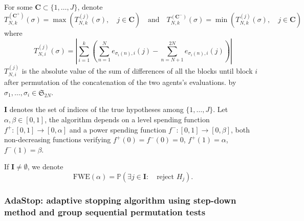 \documentclass{article}
\theoremstyle{plain}
\theoremstyle{remark}
\renewcommand{\P}{\mathbb{P}}
\renewcommand{\S}{\mathfrak{S}}
\newcommand{\1}{\mathbbm{1}}
\numberwithin{equation}{section}
\begin{document}
For some $\textbf{C} \subset \{1,\dots,J\}$, denote
$$T_{N,k}^{(\textbf{C}^+)}(\sigma)= \max\left(T_{N,k}^{(j)}(\sigma),\quad j \in \textbf{C}\right) \quad \text{and}\quad T_{N,k}^{(\textbf{C}^-)}(\sigma)= \min\left(T_{N,k}^{(j)}(\sigma),\quad j \in \textbf{C}\right)$$
where 
$$T_{N,i}^{(j)}(\sigma)= \left|\sum_{i=1}^k\left(\sum_{n=1}^{N} e_{\sigma_i(n),i}(j)-\sum_{n=N+1}^{2N} e_{\sigma_i(n),i}(j)\right)\right|$$ 
$T_{N,i}^{(j)}$ is the absolute value of the sum of differences of all the blocks until block $i$ after permutation of the concatenation of the two agents's evaluations. by $\sigma_1,\dots,\sigma_i\in \S_{2N}$.
 
$\textbf{I}$ denotes the set of indices of the true hypotheses among $\{1,\dots,J\}$. Let $\alpha, \beta \in [0,1]$, the algorithm depends on a level spending function $f^+:[0,1]\to[0,\alpha]$ and a power spending function $f^-:[0,1]\to [0,\beta]$, both non-decreasing functions verifying $f^+(0)=f^-(0)=0$, $f^+(1)=\alpha$, $f^-(1)=\beta$. 

If $\textbf{I} \neq \emptyset$, we denote 
$$\mathrm{FWE}(\alpha) = \P\left(\exists j \in \textbf{I}:\quad  \text{reject }H_j \right).$$
\subsubsection{AdaStop: adaptive stopping algorithm using step-down method and group sequential permutation tests}
\end{document}
